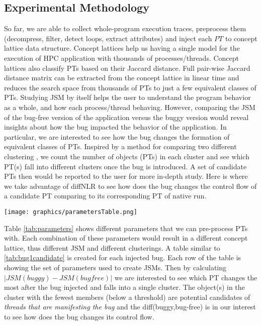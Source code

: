 \subsection{Experimental Methodology}
So far, we are able to collect whole-program execution traces, preprocess them (decompress, filter, detect loops, extract attributes) and inject each $PT$ to concept lattice data structure.
%
Concept lattices help us having a single model for the execution of HPC application with thousands of processes/threads.
%
Concept lattices also classify PTs based on their Jaccard distance.
%
Full pair-wise Jaccard distance matrix can be extracted from the concept lattice in linear time and reduces the search space from thousands of PTs to just a few equivalent classes of PTs.
%
Studying JSM by itself helps the user to understand the program behavior as a whole, and how each process/thread behaving.
%
However, comparing the JSM of the bug-free version of the application versus the buggy version would reveal insights about how the bug impacted the behavior of the application.
%
In particular, we are interested to see how the bug changes the formation of equivalent classes of PTs.
%
Inspired by a method for comparing two different clustering \cite{fowlkes83}, we count the number of objects (PTs) in each cluster and see which PT(s) fall into different clusters once the bug is introduced.
%
A set of candidate PTs then would be reported to the user for more in-depth study.
%
Here is where we take advantage of diffNLR to see how does the bug changes the control flow of a candidate PT comparing to its corresponding PT of native run.
%

\begin{figure*}[t]
\centering
\texttt{[image: graphics/parametersTable.png]}
\caption{Filters, Attributes and other Parameters used to pre-process ParLOT Traces (PTs)}
\label{tab:parameters}
\end{figure*}

Table \ref{tab:parameters} shows different parameters that we can pre-process PTs with. Each combination of these parameters would result in a different concept lattice, thus different JSM and different clusterings. 
%
A table similar to \ref{tab:bug1candidate} is created for each injected bug.
%
Each row of the table is showing the set of parameters used to create JSMs.
%
Then by calculating $ |JSM(buggy) - JSM(bugfree)| $ we are interested to see which PT changes the most after the bug injected and falls into a single cluster.
%
The object(s) in the cluster with the fewest members (below a threshold) are potential candidates of \textit{threads that are manifesting the bug} and the diff(buggy,bug-free) is in our interest to see how does the bug changes its control flow.

